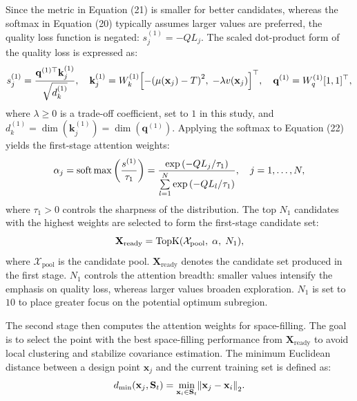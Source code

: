 \documentclass[]{interact}
\theoremstyle{plain}%
\theoremstyle{definition}
\theoremstyle{remark}
\begin{document}
Since the metric in Equation (21) is smaller for better candidates, whereas the softmax in Equation (20) typically assumes larger values are preferred, the quality loss function is negated: $s_{j}^{(1)} = -QL_{j}$. The scaled dot-product form of the quality loss is expressed as:
\begin{equation}
	s_j^{(1)} = \frac{{{{\bf{q}}^{(1) \top }}{\bf{k}}_j^{(1)}}}{{\sqrt {d_k^{(1)}} }},\quad {\bf{k}}_j^{(1)} = W_k^{(1)}{\left[ { - {{\left( {\mu ({{\bf{x}}_j}) - T} \right)}^2},\; - \lambda v({{\bf{x}}_j})} \right]^ \top },\quad {{\bf{q}}^{(1)}} = W_q^{(1)}{[1,1]^ \top },
\end{equation}
where $\lambda \ge 0$ is a trade-off coefficient, set to $1$ in this study, and $d_{k}^{(1)} = \dim(\mathbf{k}_{j}^{(1)}) = \dim(\mathbf{q}^{(1)})$. Applying the softmax to Equation (22) yields the first-stage attention weights:
\begin{equation}
	{\alpha _j} = {\rm{soft}}\max \left( {\frac{{{s^{(1)}}}}{{{\tau _1}}}} \right) = \frac{{\exp \left( { - Q{L_j}/{\tau _1}} \right)}}{{\sum\limits_{l = 1}^N {\exp } \left( { - Q{L_l}/{\tau _1}} \right)}},\quad j = 1, \ldots ,N,
\end{equation}
where $\tau_{1} > 0$ controls the sharpness of the distribution. The top $N_{1}$ candidates with the highest weights are selected to form the first-stage candidate set:
\begin{equation}
	{{\bf{X}}_{{\rm{ready}}}} = {\rm{TopK}}({{\cal X}_{{\rm{pool}}}},\;\alpha ,\;{N_1}),
\end{equation}
where $\mathcal{X}_{\mathrm{pool}}$ is the candidate pool. $\mathbf{X}_{\mathrm{ready}}$ denotes the candidate set produced in the first stage. $N_{1}$ controls the attention breadth: smaller values intensify the emphasis on quality loss, whereas larger values broaden exploration. $N_{1}$ is set to $10$ to place greater focus on the potential optimum subregion.

The second stage then computes the attention weights for space-filling. The goal is to select the point with the best space-filling performance from $\mathbf{X}_{\mathrm{ready}}$ to avoid local clustering and stabilize covariance estimation. The minimum Euclidean distance between a design point $\mathbf{x}_{j}$ and the current training set is defined as:
\begin{equation}
	{d_{\min }}({{\bf{x}}_j},{{\bf{S}}_t}) = {\min _{{{\bf{x}}_i} \in {{\bf{S}}_t}}}{\left\| {{{\bf{x}}_j} - {{\bf{x}}_i}} \right\|_2}.
\end{equation}
\end{document}
